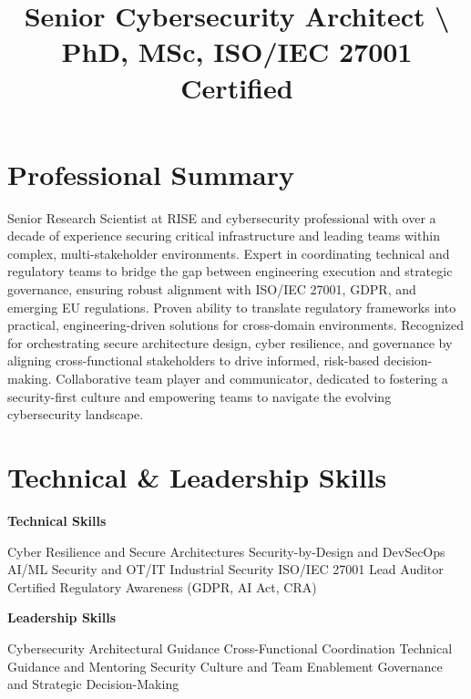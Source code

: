 \documentclass[a4paper]{moderncv}
\title{Senior Cybersecurity Architect \textbackslash{} PhD, MSc, ISO/IEC 27001 Certified}
\begin{document}
\maketitle

\section{Professional Summary}
Senior Research Scientist at RISE and cybersecurity professional with over a decade of experience securing critical infrastructure and leading teams within complex, multi-stakeholder environments. Expert in coordinating technical and regulatory teams to bridge the gap between engineering execution and strategic governance, ensuring robust alignment with ISO/IEC 27001, GDPR, and emerging EU regulations. Proven ability to translate regulatory frameworks into practical, engineering-driven solutions for cross-domain environments. Recognized for orchestrating secure architecture design, cyber resilience, and governance by aligning cross-functional stakeholders to drive informed, risk-based decision-making. Collaborative team player and communicator, dedicated to fostering a security-first culture and empowering teams to navigate the evolving cybersecurity landscape.

\section{Technical \& Leadership Skills}

\noindent
\begin{minipage}[t]{0.49\textwidth}
    \textbf{Technical Skills}\par\medskip
        Cyber Resilience and Secure Architectures \newline
        Security-by-Design and DevSecOps \newline
        AI/ML Security and OT/IT Industrial Security \newline
        ISO/IEC 27001 Lead Auditor Certified \newline
        Regulatory Awareness (GDPR, AI Act, CRA)
    \end{minipage}\hfill
    \begin{minipage}[t]{0.49\textwidth}
    \textbf{Leadership Skills}\par\medskip
        Cybersecurity Architectural Guidance \newline
        Cross-Functional Coordination \newline
        Technical Guidance and Mentoring \newline
        Security Culture and Team Enablement \newline
        Governance and Strategic Decision-Making
\end{minipage}
\end{document}
